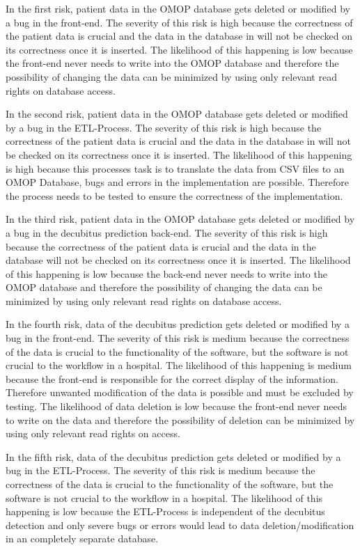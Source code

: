 In the first risk, patient data in the OMOP database gets deleted or modified by a bug in the front-end. 
The severity of this risk is high because the correctness of the patient data is crucial and the data in the database in will not be checked on its correctness once it is inserted.  
The likelihood of this happening is low because the front-end never needs to write into the OMOP database and therefore the possibility of changing the data can be minimized by using only relevant read rights on database access.

In the second risk, patient data in the OMOP database gets deleted or modified by a bug in the ETL-Process. 
The severity of this risk is high because the correctness of the patient data is crucial and the data in the database in will not be checked on its correctness once it is inserted.  
The likelihood of this happening is high because this processes task is to translate the data from CSV files to an OMOP Database, bugs and errors in the implementation are possible.
Therefore the process needs to be tested to ensure the correctness of the implementation.

In the third risk, patient data in the OMOP database gets deleted or modified by a bug in the decubitus prediction back-end. 
The severity of this risk is high because the correctness of the patient data is crucial and the data in the database will not be checked on its correctness once it is inserted.  
The likelihood of this happening is low because the back-end never needs to write into the OMOP database and therefore the possibility of changing the data can be minimized by using only relevant read rights on database access.

In the fourth risk, data of the decubitus prediction gets deleted or modified by a bug in the front-end.
The severity of this risk is medium because the correctness of the data is crucial to the functionality of the software, but the software is not crucial to the workflow in a hospital.
The likelihood of this happening is medium because the front-end is responsible for the correct display of the information. Therefore unwanted modification of the data is possible and must be excluded by testing.
The likelihood of data deletion is low because the front-end never needs to write on the data and therefore the possibility of deletion can be minimized by using only relevant read rights on access.

In the fifth risk, data of the decubitus prediction gets deleted or modified by a bug in the ETL-Process.
The severity of this risk is medium because the correctness of the data is crucial to the functionality of the software, but the software is not crucial to the workflow in a hospital.
The likelihood of this happening is low because the ETL-Process is independent of the decubitus detection and only severe bugs or errors would lead to data deletion/modification in an completely separate database.

